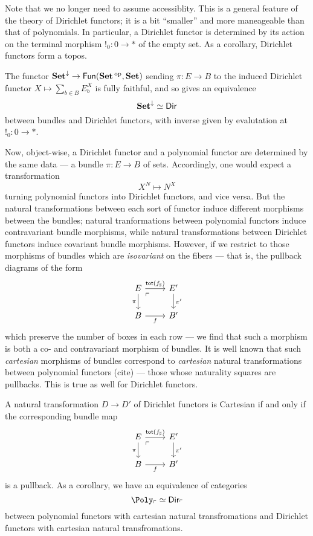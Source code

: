 Note that we no longer need to assume accessiblity. This is a general feature of
the theory of Dirichlet functors; it is a bit ``smaller'' and more maneageable
than that of polynomials. In particular, a Dirichlet functor is determined by
its action on the terminal morphism $!_0 : 0 \to \ast$ of the empty set. As a corollary, Dirichlet functors form a topos.

\begin{thm}\label{thm:dirichlet.set.equivalence}
The functor $\operatorname{\textbf{Set}}^{\downarrow} \to \mathsf{{Fun}}(\operatorname{\textbf{Set}}\operatorname{^\text{op}}, \operatorname{\textbf{Set}})$ sending $\pi : E
\to B$ to the induced Dirichlet functor $X \mapsto \sum_{b \in B} E_b^X$ is
fully faithful, and so gives an equivalence
$$\operatorname{\textbf{Set}}^{\downarrow} \simeq \operatorname{\mathsf{{Dir}}}$$
between bundles and Dirichlet functors, with inverse given by evalutation at
$!_0 : 0 \to \ast$.
\end{thm}


Now, object-wise, a Dirichlet functor and a polynomial functor are determined by
the same data --- a bundle $\pi : E \to B$ of sets. Accordingly, one would
expect a transformation
$$X^N \mapsto N^X$$
turning polynomial functors into Dirichlet functors, and vice versa. But the
natural transformations between each sort of functor induce different morphisms
between the bundles; natural tranformations between polynomial functors induce
contravariant bundle morphisms, while natural transformations between Dirichlet
functors induce covariant bundle morphisms. However, if we restrict to those
morphisms of bundles which are \emph{isovariant} on the fibers --- that is, the
pullback diagrams of the form
\[
  \begin{tikzcd}
E \arrow[r, "\term{tot}(f_{\sharp})"] \arrow[d, "\pi"'] \arrow[dr, phantom,
"\ulcorner" very near start] & E' \arrow[d, "\pi'"] \\
B \arrow[r, "f"']                                       & B'                  
\end{tikzcd}
\]
which preserve the number of boxes in each row --- we find that such a morphism
is both a co- and contravariant morphism of bundles. It is well known that such
\emph{cartesian} morphisms of bundles correspond to \emph{cartesian} natural
transformations between polynomial functors (cite) --- those whose naturality
squares are pullbacks. This is true as well for Dirichlet functors.
\begin{thm}
A natural transformation $D \to D'$ of Dirichlet functors is Cartesian if and
only if the corresponding bundle map
\[
  \begin{tikzcd}
E \arrow[r, "\term{tot}(f_{\sharp})"] \arrow[d, "\pi"'] \arrow[dr, phantom,
"\ulcorner" very near start] & E' \arrow[d, "\pi'"] \\
B \arrow[r, "f"']                                       & B'                  
\end{tikzcd}
\]
is a pullback. As a corollary, we have an equivalence of categories
$$\Poly_{\ulcorner} \simeq \Dir_{\ulcorner}$$
between polynomial functors with cartesian natural transfromations and Dirichlet
functors with cartesian natural transfromations.
\end{thm}

